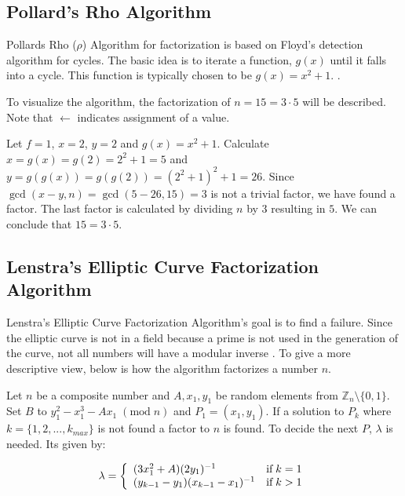 \subsection{Pollard's Rho Algorithm}
Pollards Rho ($\rho$) Algorithm for factorization is based on Floyd's detection algorithm for cycles. The basic idea is to iterate a function, $g(x)$ until it falls into a cycle. This function is typically chosen to be $g(x)=x^2+1$. \cite{pollardsRhoAlgorithm}\cite{pollardsRhoAlgorithm2}.

To visualize the algorithm, the factorization of $n=15=3\cdot5$ will be described. Note that $\leftarrow$ indicates assignment of a value.

Let $f=1$, $x=2$, $y=2$ and $g(x)=x^2+1$. Calculate $x=g(x)=g(2)=2^2+1=5$ and $y=g(g(x))=g(g(2))=(2^2+1)^2+1=26$. Since $\gcd(x - y, n)=\gcd(5 - 26, 15)=3$ is not a trivial factor, we have found a factor. The last factor is calculated by dividing $n$ by $3$ resulting in $5$. We can conclude that $15=3\cdot5$.

\subsection{Lenstra's Elliptic Curve Factorization Algorithm}
Lenstra's Elliptic Curve Factorization Algorithm's goal is to find a failure. Since the elliptic curve is not in a field because a prime is not used in the generation of the curve, not all numbers will have a modular inverse \cite{LenstrasFactorizationAlgorithm}. To give a more descriptive view, below is how the algorithm factorizes a number $n$.

Let $n$ be a composite number and $A, x_1, y_1$ be random elements from $\mathbb{Z}_n \setminus \{0,1\}$. Set $B$ to $y_1^2 - x_1^3 - Ax_1\; (\text{mod}\;n)$ and $P_1 = (x_1,y_1)$. If a solution to $P_k$ where $k = \{1,2,...,k_{max}\}$ is not found a  factor to $n$ is found. To decide the next $P$, $\lambda$ is needed. Its given by:

\begin{equation*}
    \lambda = \left\{\begin{array}{l l}
         (3x_1^2 + A)(2y_1)^{-1} & \text{if}\; k = 1\\
         (y_{k-1} - y_1)(x_{k-1} - x_1)^{-1} & \text{if}\; k > 1
    \end{array}\right.
\end{equation*}


